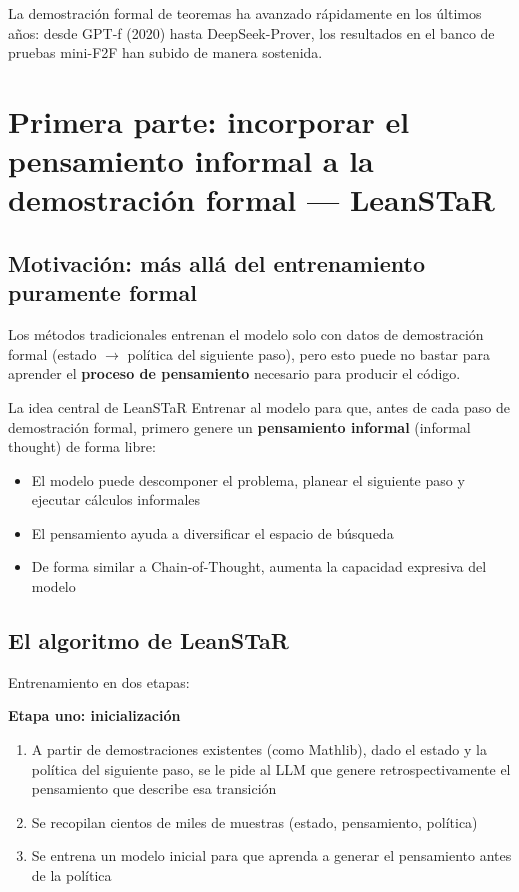 \documentclass[a4paper]{article}
\begin{document}
La demostración formal de teoremas ha avanzado rápidamente en los últimos años: desde GPT-f (2020) hasta DeepSeek-Prover, los resultados en el banco de pruebas mini-F2F han subido de manera sostenida.
\section{Primera parte: incorporar el pensamiento informal a la demostración formal — LeanSTaR}

\subsection{Motivación: más allá del entrenamiento puramente formal}

Los métodos tradicionales entrenan el modelo solo con datos de demostración formal (estado $\to$ política del siguiente paso), pero esto puede no bastar para aprender el \textbf{proceso de pensamiento} necesario para producir el código.

\begin{importantbox}{La idea central de LeanSTaR}
Entrenar al modelo para que, antes de cada paso de demostración formal, primero genere un \textbf{pensamiento informal} (informal thought) de forma libre:
\begin{itemize}
    \item El modelo puede descomponer el problema, planear el siguiente paso y ejecutar cálculos informales
    \item El pensamiento ayuda a diversificar el espacio de búsqueda
    \item De forma similar a Chain-of-Thought, aumenta la capacidad expresiva del modelo
\end{itemize}
\end{importantbox}

\subsection{El algoritmo de LeanSTaR}

Entrenamiento en dos etapas:

\textbf{Etapa uno: inicialización}
\begin{enumerate}
    \item A partir de demostraciones existentes (como Mathlib), dado el estado y la política del siguiente paso, se le pide al LLM que genere retrospectivamente el pensamiento que describe esa transición
    \item Se recopilan cientos de miles de muestras (estado, pensamiento, política)
    \item Se entrena un modelo inicial para que aprenda a generar el pensamiento antes de la política
\end{enumerate}
\end{document}
